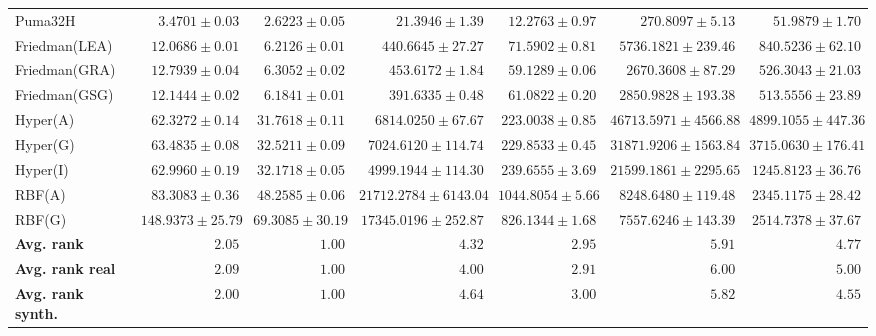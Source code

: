 \begin{table*}[!htbp]
{\begin{tabular}{lrrrrrr}
		Puma32H & $3.4701 \pm 0.03$ & $\mathbf{2.6223 \pm 0.05}$ & $21.3946 \pm 1.39$ & $12.2763 \pm 0.97$ & $270.8097 \pm 5.13$ & $51.9879 \pm 1.70$\\
		Friedman(LEA) & $12.0686 \pm 0.01$ & $\mathbf{6.2126 \pm 0.01}$ & $440.6645 \pm 27.27$ & $71.5902 \pm 0.81$ & $5736.1821 \pm 239.46$ & $840.5236 \pm 62.10$\\
		Friedman(GRA) & $12.7939 \pm 0.04$ & $\mathbf{6.3052 \pm 0.02}$ & $453.6172 \pm 1.84$ & $59.1289 \pm 0.06$ & $2670.3608 \pm 87.29$ & $526.3043 \pm 21.03$\\
		Friedman(GSG) & $12.1444 \pm 0.02$ & $\mathbf{6.1841 \pm 0.01}$ & $391.6335 \pm 0.48$ & $61.0822 \pm 0.20$ & $2850.9828 \pm 193.38$ & $513.5556 \pm 23.89$\\
		Hyper(A) & $62.3272 \pm 0.14$ & $\mathbf{31.7618 \pm 0.11}$ & $6814.0250 \pm 67.67$ & $223.0038 \pm 0.85$ & $46713.5971 \pm 4566.88$ & $4899.1055 \pm 447.36$\\
		Hyper(G) & $63.4835 \pm 0.08$ & $\mathbf{32.5211 \pm 0.09}$ & $7024.6120 \pm 114.74$ & $229.8533 \pm 0.45$ & $31871.9206 \pm 1563.84$ & $3715.0630 \pm 176.41$\\
		Hyper(I) & $62.9960 \pm 0.19$ & $\mathbf{32.1718 \pm 0.05}$ & $4999.1944 \pm 114.30$ & $239.6555 \pm 3.69$ & $21599.1861 \pm 2295.65$ & $1245.8123 \pm 36.76$\\
		RBF(A) & $83.3083 \pm 0.36$ & $\mathbf{48.2585 \pm 0.06}$ & $21712.2784 \pm 6143.04$ & $1044.8054 \pm 5.66$ & $8248.6480 \pm 119.48$ & $2345.1175 \pm 28.42$\\
		RBF(G) & $148.9373 \pm 25.79$ & $\mathbf{69.3085 \pm 30.19}$ & $17345.0196 \pm 252.87$ & $826.1344 \pm 1.68$ & $7557.6246 \pm 143.39$ & $2514.7378 \pm 37.67$\\
		\midrule
		\textbf{{Avg. rank}} & $2.05$ & $\mathbf{1.00}$ & $4.32$ & $2.95$ & $5.91$ & $4.77$\\
		\textbf{{Avg. rank real}} & $2.09$ & $\mathbf{1.00}$ & $4.00$ & $2.91$ & $6.00$ & $5.00$\\
		\textbf{{Avg. rank synth.}} & $2.00$ & $\mathbf{1.00}$ & $4.64$ & $3.00$ & $5.82$ & $4.55$\\
		\bottomrule
	\end{tabular}}
\end{table*}
